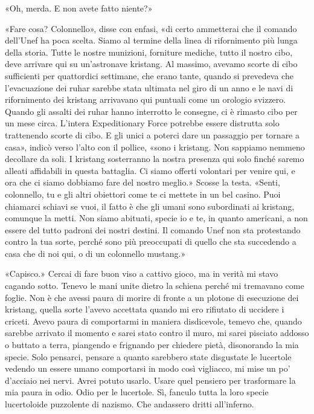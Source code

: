 «Oh, merda. E non avete fatto niente?»

«Fare cosa? Colonnello», disse con enfasi, «di certo ammetterai che il
comando dell'Unef ha poca scelta. Siamo al termine della linea di
rifornimento più lunga della storia. Tutte le nostre munizioni,
forniture mediche, tutto il nostro cibo, deve arrivare qui su
un'astronave kristang. Al massimo, avevamo scorte di cibo sufficienti
per quattordici settimane, che erano tante, quando si prevedeva che
l'evacuazione dei ruhar sarebbe stata ultimata nel giro di un anno e le
navi di rifornimento dei kristang arrivavano qui puntuali come un
orologio svizzero. Quando gli assalti dei ruhar hanno interrotto le
consegne, ci è rimasto cibo per un mese circa. L'intera Expeditionary
Force potrebbe essere distrutta solo trattenendo scorte di cibo. E gli
unici a poterci dare un passaggio per tornare a casa», indicò verso
l'alto con il pollice, «sono i kristang. Non sappiamo nemmeno decollare
da soli. I kristang sosterranno la nostra presenza qui solo finché
saremo alleati affidabili in questa battaglia. Ci siamo offerti
volontari per venire qui, e ora che ci siamo dobbiamo fare del nostro
meglio.» Scosse la testa. «Senti, colonnello, tu e gli altri obiettori
come te ci mettete in un bel casino. Puoi chiamarci schiavi se vuoi, il
fatto è che gli umani sono subordinati ai kristang, comunque la metti.
Non siamo abituati, specie io e te, in quanto americani, a non essere
del tutto padroni dei nostri destini. Il comando Unef non sta
protestando contro la tua sorte, perché sono più preoccupati di quello
che sta succedendo a casa che di noi qui, o di un colonnello mustang.»

«Capisco.» Cercai di fare buon viso a cattivo gioco, ma in verità mi
stavo cagando sotto. Tenevo le mani unite dietro la schiena perché mi
tremavano come foglie. Non è che avessi paura di morire di fronte a un
plotone di esecuzione dei kristang, quella sorte l'avevo accettata
quando mi ero rifiutato di uccidere i criceti. Avevo paura di
comportarmi in maniera disdicevole, temevo che, quando sarebbe arrivato
il momento e sarei stato contro il muro, mi sarei pisciato addosso o
buttato a terra, piangendo e frignando per chiedere pietà, disonorando
la mia specie. Solo pensarci, pensare a quanto sarebbero state
disgustate le lucertole vedendo un essere umano comportarsi in modo così
vigliacco, mi mise un po' d'acciaio nei nervi. Avrei potuto usarlo.
Usare quel pensiero per trasformare la mia paura in odio. Odio per le
lucertole. Sì, fanculo tutta la loro specie lucertoloide puzzolente di
nazismo. Che andassero dritti all'inferno.

